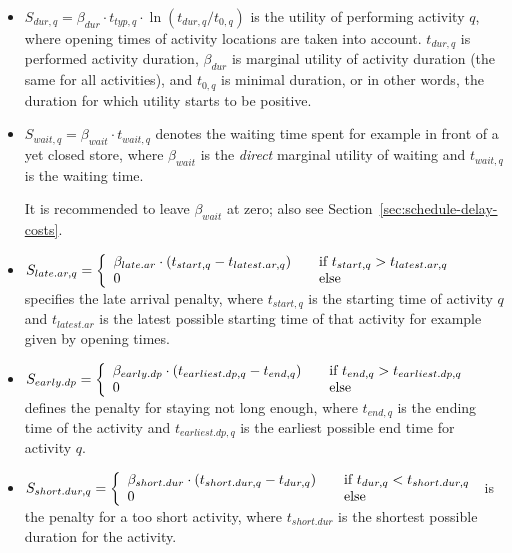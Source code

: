 \begin{itemize}
\item $S_{dur,q}= \beta_{dur} \cdot t_{typ,q} \cdot \ln(t_{dur,q}/t_{0,q})$ 
%
is the utility of performing activity $q$, where opening times of activity locations are taken into account. $t_{dur,q}$ is performed activity duration, $\beta_{dur}$ is marginal utility of activity duration (the same for all activities),
and $t_{0,q}$ is minimal duration, or in other words, the duration for which utility starts to be positive. 
%
%
\item $ S_{wait,q} = \beta_{wait} \cdot t_{wait,q}$ 
%
denotes the waiting time spent for example in front of a yet closed store, where $\beta_{wait}$ is the \emph{direct} marginal utility of waiting and $t_{wait,q}$ is the waiting time.

It is recommended to leave $\beta_{wait}$ at zero; also see Section~\ref{sec:schedule-delay-costs}.

\item $S_{late.ar,q}= \left\{
  \begin{array}{l l}
    \beta_{late.ar} \cdot (t_{start,q} - t_{latest.ar,q}) & \quad \text{if $t_{start,q} > t_{latest.ar,q}$}\\
    0 & \quad \text{else}
  \end{array} \right.$
%  
  specifies the late arrival penalty, where $t_{start,q}$ is the starting time of activity $q$ and $t_{latest.ar}$ is the latest possible starting time of that activity for example given by opening times.
%
\item $S_{early.dp} = \left\{
  \begin{array}{l l}
    \beta_{early.dp} \cdot (t_{earliest.dp, q} - t_{end,q}) & \quad \text{if $t_{end,q} > t_{earliest.dp,q}$}\\
    0 & \quad \text{else}
  \end{array} \right.$
%
defines the penalty for staying not long enough, where $t_{end,q}$ is the ending time of the activity and $t_{earliest.dp,q}$ is the earliest possible end time for activity $q$.
%
\item $ S_{short.dur, q} = \left\{
  \begin{array}{l l}
    \beta_{short.dur} \cdot (t_{short.dur, q} - t_{dur,q}) & \quad \text{if $t_{dur,q} < t_{short.dur,q}$}\\
    0 & \quad \text{else}
  \end{array} \right.$
%  
  is the penalty for a too short activity, where $t_{short.dur}$ is the shortest possible duration for the activity.
\end{itemize}

